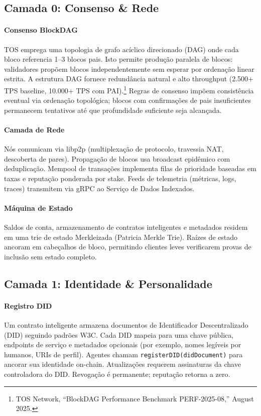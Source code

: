 \documentclass[11pt]{article}
\begin{document}
\subsection{Camada 0: Consenso \& Rede}
\paragraph{Consenso BlockDAG} TOS emprega uma topologia de grafo acíclico direcionado (DAG) onde cada bloco referencia 1--3 blocos pais. Isto permite produção paralela de blocos: validadores propõem blocos independentemente sem esperar por ordenação linear estrita. A estrutura DAG fornece redundância natural e alto throughput (2.500+ TPS baseline, 10.000+ TPS com PAI).\footnote{TOS Network, ``BlockDAG Performance Benchmark PERF-2025-08,'' August 2025.} Regras de consenso impõem consistência eventual via ordenação topológica; blocos com confirmações de pais insuficientes permanecem tentativos até que profundidade suficiente seja alcançada.

\paragraph{Camada de Rede} Nós comunicam via libp2p (multiplexação de protocolo, travessia NAT, descoberta de pares). Propagação de blocos usa broadcast epidêmico com deduplicação. Mempool de transações implementa filas de prioridade baseadas em taxas e reputação ponderada por stake. Feeds de telemetria (métricas, logs, traces) transmitem via gRPC ao Serviço de Dados Indexados.

\paragraph{Máquina de Estado} Saldos de conta, armazenamento de contratos inteligentes e metadados residem em uma trie de estado Merkleizada (Patricia Merkle Trie). Raízes de estado ancoram em cabeçalhos de bloco, permitindo clientes leves verificarem provas de inclusão sem estado completo.

\subsection{Camada 1: Identidade \& Personalidade}
\paragraph{Registro DID} Um contrato inteligente armazena documentos de Identificador Descentralizado (DID) seguindo padrões W3C. Cada DID mapeia para uma chave pública, endpoints de serviço e metadados opcionais (por exemplo, nomes legíveis por humanos, URIs de perfil). Agentes chamam \texttt{registerDID(didDocument)} para ancorar sua identidade on-chain. Atualizações requerem assinaturas da chave controladora do DID. Revogação é permanente; reputação retorna a zero.
\end{document}
